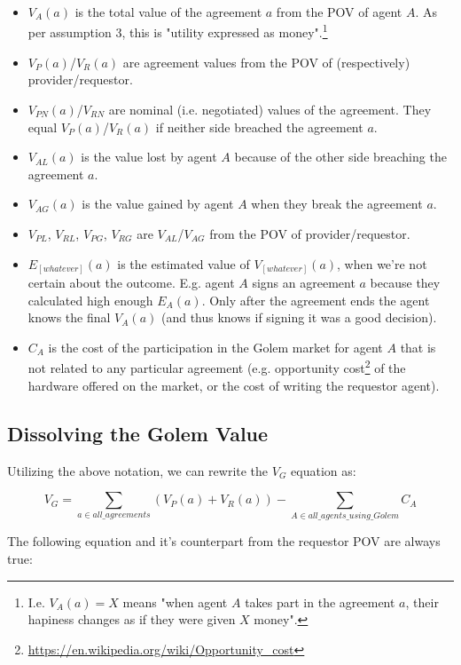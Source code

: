 \documentclass{article}
\begin{document}
\begin{itemize}
\item{$V_A(a)$ is the total value of the agreement $a$ from the POV of agent $A$. As per assumption 3, this is "utility expressed as money".\footnote{
I.e. $V_A(a) = X$ means "when agent $A$ takes part in the agreement $a$, their hapiness changes as if they were given $X$ money".}}
\item{$V_P(a)$/$V_R(a)$ are agreement values from the POV of (respectively) provider/requestor.}
\item{$V_{PN}(a)$/$V_{RN}$ are nominal (i.e. negotiated) values of the agreement. They equal $V_P(a)$/$V_R(a)$ if neither side breached the agreement $a$.}
\item{$V_{AL}(a)$ is the value lost by agent $A$ because of the other side breaching the agreement $a$.}
\item{$V_{AG}(a)$ is the value gained by agent $A$ when they break the agreement $a$.}
\item{$V_{PL}$, $V_{RL}$, $V_{PG}$, $V_{RG}$ are $V_{AL}$/$V_{AG}$ from the POV of provider/requestor.}
\item{$E_{[whatever]}(a)$ is the estimated value of $V_{[whatever]}(a)$, when we're not certain about the outcome. 
E.g. agent $A$ signs an agreement $a$ because they calculated high enough $E_A(a)$. 
Only after the agreement ends the agent knows the final $V_A(a)$ (and thus knows if signing it was a good decision).}
\item{$C_A$ is the cost of the participation in the Golem market for agent $A$ that is not related to any particular agreement 
(e.g. opportunity cost\footnote{\href{https://en.wikipedia.org/wiki/Opportunity\_cost}{https://en.wikipedia.org/wiki/Opportunity\_cost}} of the hardware offered on the market, 
or the cost of writing the requestor agent).}
\end{itemize}

\subsection{Dissolving the Golem Value}

Utilizing the above notation, we can rewrite the $V_G$ equation as:

\begin{equation}
    V_G = \sum_{a \in all\_agreements}(V_P(a) + V_R(a)) - \sum_{A \in all\_agents\_using\_Golem}C_A
\end{equation}

The following equation and it's counterpart from the requestor POV are always true:
\end{document}
